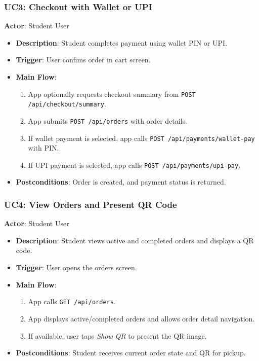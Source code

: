 \subsubsection{UC3: Checkout with Wallet or UPI}
\textbf{Actor}: Student User
\begin{itemize}[nosep]
  \item \textbf{Description}: Student completes payment using wallet PIN or UPI.
  \item \textbf{Trigger}: User confims order in cart screen.
  \item \textbf{Main Flow}:
    \begin{enumerate}[nosep]
      \item App optionally requests checkout summary from \texttt{POST /api/checkout/summary}.
      \item App submits \texttt{POST /api/orders} with order details.
      \item If wallet payment is selected, app calls \texttt{POST /api/payments/wallet-pay} with PIN.
      \item If UPI payment is selected, app calls \texttt{POST /api/payments/upi-pay}.
    \end{enumerate}
  \item \textbf{Postconditions}: Order is created, and payment status is returned.
\end{itemize}

\subsubsection{UC4: View Orders and Present QR Code}
\textbf{Actor}: Student User
\begin{itemize}[nosep]
  \item \textbf{Description}: Student views active and completed orders and displays a QR code.
  \item \textbf{Trigger}: User opens the orders screen.
  \item \textbf{Main Flow}:
    \begin{enumerate}[nosep]
      \item App calls \texttt{GET /api/orders}.
      \item App displays active/completed orders and allows order detail navigation.
      \item If available, user taps \textit{Show QR} to present the QR image.
    \end{enumerate}
  \item \textbf{Postconditions}: Student receives current order state and QR for pickup.
\end{itemize}

